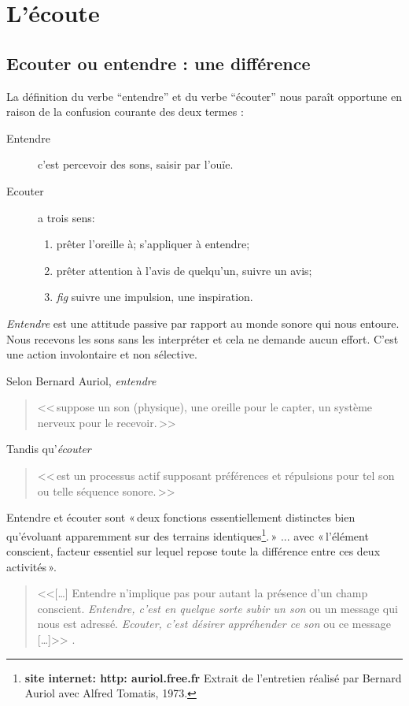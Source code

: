 \chapter{L'écoute}

\section{Ecouter ou entendre : une différence}

La définition du verbe ``entendre'' et du verbe ``écouter'' 
\autocite[p. 361-385]{hachette:dictionnaire} nous paraît opportune
en raison de la confusion courante des deux termes :
\begin{description}
\item[Entendre] c'est  percevoir des sons, saisir par l'ouïe.
\item[Ecouter] a trois sens: 
\begin{enumerate}
	\item prêter l'oreille à; s'appliquer à entendre;
	\item prêter attention à l'avis de quelqu'un, suivre un avis;
	\item \emph{fig} suivre une impulsion,	une inspiration.
\end{enumerate}
\end{description}



\emph{Entendre} est une attitude passive par rapport au monde sonore
qui nous entoure. Nous recevons les sons sans les interpréter et cela
ne demande aucun effort. C'est une action involontaire et non
sélective. 

Selon Bernard Auriol\autocite[p. 2, chap. 1]{auriol:cle}, \textit{entendre} 
\begin{quote}
	<<\,suppose un son (physique), une oreille
	pour le capter, un système nerveux pour le recevoir.\,>>
\end{quote} 
Tandis qu'\textit{écouter}
\begin{quote}
	<<\,est un
	processus actif supposant préférences et répulsions pour tel son ou
	telle séquence sonore.\,>>
\end{quote}


Entendre et écouter sont «\,deux
fonctions essentiellement distinctes bien qu'évoluant apparemment sur
des terrains identiques\footnote{\textbf{site internet: http: auriol.free.fr} Extrait de l'entretien réalisé par
	Bernard Auriol avec Alfred Tomatis, 1973.}.\,» ... avec «\,l'élément conscient, facteur essentiel sur lequel repose toute la
différence entre ces deux activités\,».
\begin{quote}
	
	<<[\ldots] Entendre n'implique pas pour autant la pré\-sen\-ce d'un champ
	conscient. \emph{Entendre, c'est en quelque sorte subir
		un son} ou un message qui nous est adressé. \emph{Ecouter, c'est désirer appréhender ce son} ou ce message [\ldots]>>
	\autocite{tomatis:education}.	
\end{quote}




